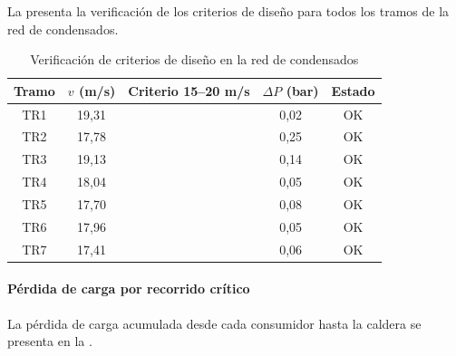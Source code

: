 \documentclass[12pt]{article}
\begin{document}
La  presenta la verificación de los criterios de diseño para todos los tramos de la red de condensados.

\begin{table}[H]
	\centering
	\caption{Verificación de criterios de diseño en la red de condensados}
	\label{tab:verificacion-condensados}
	\begin{tabular}{ccccc}
		\toprule
		\textbf{Tramo} & \textbf{$v$ (m/s)} & \textbf{Criterio 15--20 m/s} & \textbf{$\Delta P$ (bar)} & \textbf{Estado} \\
		\midrule
		TR1            & 19{,}31            & \checkmark                   & 0{,}02                    & OK              \\
		TR2            & 17{,}78            & \checkmark                   & 0{,}25                    & OK              \\
		TR3            & 19{,}13            & \checkmark                   & 0{,}14                    & OK              \\
		TR4            & 18{,}04            & \checkmark                   & 0{,}05                    & OK              \\
		TR5            & 17{,}70            & \checkmark                   & 0{,}08                    & OK              \\
		TR6            & 17{,}96            & \checkmark                   & 0{,}05                    & OK              \\
		TR7            & 17{,}41            & \checkmark                   & 0{,}06                    & OK              \\
		\bottomrule
	\end{tabular}
\end{table}

\paragraph{Pérdida de carga por recorrido crítico}

La pérdida de carga acumulada desde cada consumidor hasta la caldera se presenta en la .
\end{document}
